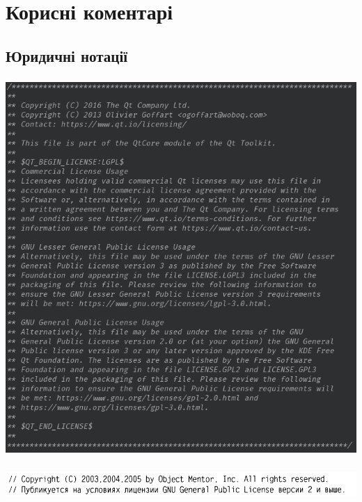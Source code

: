 \documentclass[12pt,pdf,utf8,ukrainian,aspectratio=169]{beamer}
\makeatletter
\newcommand*{\currentname}{\@currentlabelname}
\makeatother
\begin{document}
	\section{Корисні коментарі}
	\subsection{Юридичні нотації}
	\begin{frame}\frametitle{\currentname}
		\begin{center}
			\includegraphics[scale=0.35]{clean_code_3_1.png}
		\end{center}
	\end{frame}
	
	\begin{frame}\frametitle{\currentname}
		\includegraphics[scale=0.65]{clean_code_3.png}\hfill	
	\end{frame}
	
\end{document}
